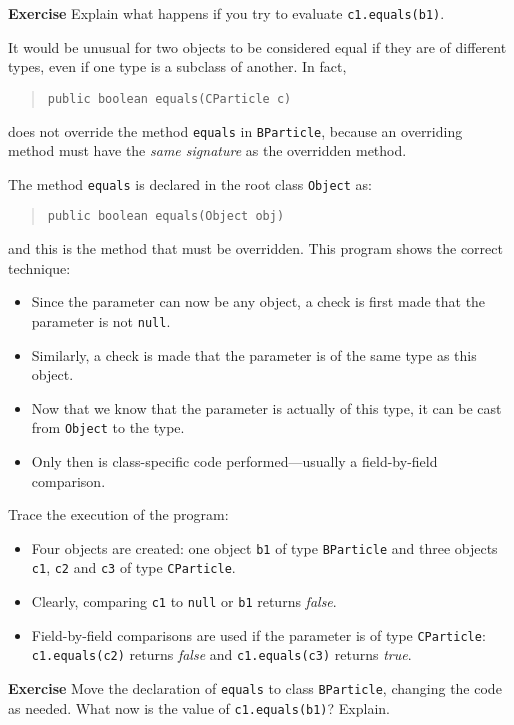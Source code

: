 \textbf{Exercise} Explain what happens if you try to evaluate \texttt{c1.equals(b1)}.

\bigskip


It would be unusual for two objects to be considered equal if they
are of different types, even if one type is a subclass of another.
In fact, 
\begin{quote}
\texttt{public boolean equals(CParticle c)}
\end{quote}
does not override the method \texttt{equals} in \texttt{BParticle},
because an overriding method must have the \emph{same signature} as the overridden
method.

The method \texttt{equals} is declared in the root class \texttt{Object} as:
\begin{quote}
\texttt{public boolean equals(Object obj)}
\end{quote}
and this is the method that must be overridden.
This program shows the correct technique:
\begin{itemize}
	\item Since the parameter can now be any object, a check is first made that
	the parameter is not \texttt{null}.
	\item Similarly, a check is made that the parameter is of the same
	type as this object.
	\item Now that we know that the parameter is actually of this type,
	it can be cast from \texttt{Object} to the type.
	\item Only then is class-specific code performed---usually a field-by-field comparison.
\end{itemize}

Trace the execution of the program:
\begin{itemize}
\item Four objects are created: one object \texttt{b1} of type \texttt{BParticle} 
and three objects \texttt{c1}, \texttt{c2} and \texttt{c3} of type \texttt{CParticle}.
\item Clearly, comparing \texttt{c1} to \texttt{null} or \texttt{b1} returns \emph{false}.
\item Field-by-field comparisons are used if the parameter is of type \texttt{CParticle}: \texttt{c1.equals(c2)} returns \emph{false} and \texttt{c1.equals(c3)} returns \emph{true}.
\end{itemize}

\textbf{Exercise} Move the declaration of \texttt{equals} to class
\texttt{BParticle}, changing the code as needed. What now is the value of
\texttt{c1.equals(b1)}? Explain.
